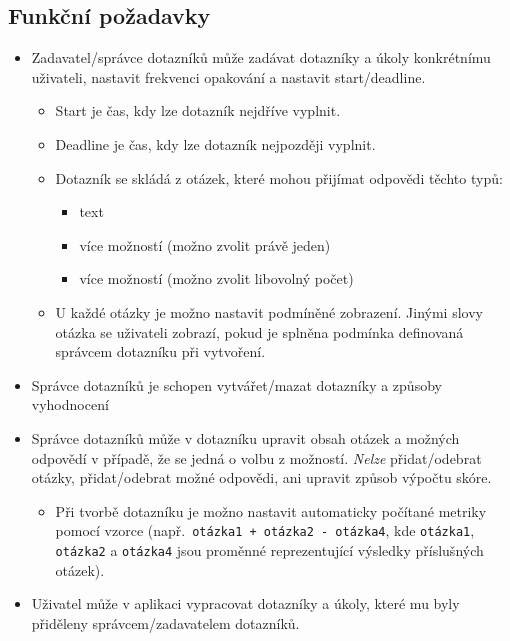 \subsection{Funkční požadavky}\label{subsec:funkcni-pozadavky}
\begin{itemize}
\item
  Zadavatel/správce dotazníků může zadávat dotazníky a úkoly konkrétnímu uživateli, nastavit frekvenci opakování a nastavit start/deadline.

  \begin{itemize}
  \item
    Start je čas, kdy lze dotazník nejdříve vyplnit.
  \item
    Deadline je čas, kdy lze dotazník nejpozději vyplnit.
  \item
    Dotazník se skládá z otázek, které mohou přijímat odpovědi těchto typů:

    \begin{itemize}
    \item
      text
    \item
      více možností (možno zvolit právě jeden)
    \item
      více možností (možno zvolit libovolný počet)
    \end{itemize}
  \item
  U každé otázky je možno nastavit podmíněné zobrazení.
  Jinými slovy otázka se uživateli zobrazí, pokud je splněna podmínka definovaná správcem dotazníku při vytvoření.
  \end{itemize}
\item
Správce dotazníků je schopen vytvářet/mazat dotazníky a způsoby vyhodnocení
\item
Správce dotazníků může v dotazníku upravit obsah otázek a možných odpovědí v případě, že se jedná o volbu z možností.
\textit{Nelze} přidat/odebrat otázky, přidat/odebrat možné odpovědi, ani upravit způsob výpočtu skóre.

  \begin{itemize}
  \item
    Při tvorbě dotazníku je možno nastavit automaticky počítané metriky pomocí vzorce (např.\ \texttt{otázka1\ +\ otázka2\ -\ otázka4}, kde \texttt{otázka1}, \texttt{otázka2} a \texttt{otázka4} jsou proměnné reprezentující výsledky příslušných otázek).
  \end{itemize}
\item
  Uživatel může v aplikaci vypracovat dotazníky a úkoly, které mu byly přiděleny správcem/zadavatelem dotazníků.


\end{itemize}
